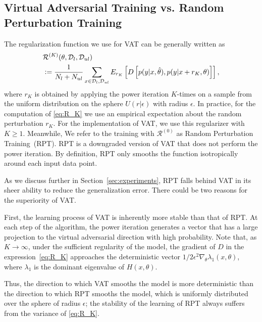 \documentclass[10pt,journal,compsoc]{IEEEtran}
\newcommand{\defeq}{\vcentcolon=}
\begin{document}
 \subsection{\label{subsec:vatvsrp}Virtual Adversarial Training vs. Random Perturbation Training}
The regularization function we use for VAT can be generally written as 
\begin{align}
&\mathcal{R}^{(K)}(\theta, \mathcal{D}_l, \mathcal{D}_{ul}) \nonumber \\
&\defeq \frac{1}{N_l + N_{ul}}\sum_{x\in \mathcal{D}_l, \mathcal{D}_{ul}} E_{r_K} \left[ D\left[p(y|x,\hat{\theta}),p(y|x+r_K,\theta)\right]\right], \label{eq:R_K}
\end{align}
where $r_K$ is obtained by applying the power iteration $K$-times on a sample from the uniform distribution on the sphere $U(r|\epsilon)$ with radius $\epsilon$.
In practice, for the computation of \eqref{eq:R_K} we use an empirical expectation about the random perturbation $r_K$.  
For the implementation of VAT, we use this regularizer with $K \geq 1$.
Meanwhile, We refer to the training with $\mathcal{R}^{(0)}$ as Random Perturbation Training~(RPT). 
RPT is a downgraded version of VAT that does not perform the power iteration. 
By definition, RPT only smooths the function isotropically around each input data point. 

As we discuss further in Section~\ref{sec:experiments}, RPT falls behind VAT in its sheer ability to reduce the generalization error. 
There could be two reasons for the superiority of VAT. 

First, the learning process of VAT is inherently more stable than that of RPT. 
At each step of the algorithm, the power iteration generates a vector that has a large projection to the virtual adversarial direction with high probability.
Note that, as $K \to \infty$, under the sufficient regularity of the model, the gradient of $D$ in the expression~\eqref{eq:R_K} approaches the deterministic vector $1/2\epsilon^2\nabla_\theta \lambda_1 (x, \theta)$, where $\lambda_1$ is the dominant eigenvalue of $H(x, \theta)$.

Thus, the direction to which VAT smooths the model is more deterministic than the direction to which RPT smooths the model, which is uniformly distributed over the sphere of radius $\epsilon$; the stability of the learning of RPT always suffers from the variance of \eqref{eq:R_K}. 
\end{document}
